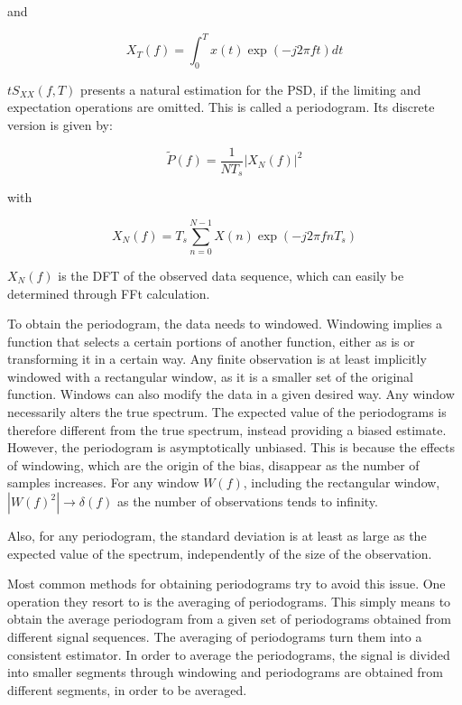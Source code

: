 \begin{refsection}
\noindent and 

\begin{equation}
	X_T(f) = \int_0^T x(t) \exp(-j 2 \pi f t) dt
\end{equation}

$t{S}_{XX}(f,T)$ presents a natural estimation for the PSD, if the limiting and
expectation operations are omitted. This is called a periodogram. Its discrete
version is given by:

\begin{equation}
	\tilde{P}\left(f\right)  = \frac{1}{NT_s}{|X_N{\left(f\right)}|}^2
\end{equation}

\noindent with

\begin{equation}
	X_N\left(f\right) = T_s \sum_{n=0}^{N-1} X(n)
	\exp\left(-j2\pi f n T_s \right)
\end{equation}

$X_N(f)$ is the DFT of the observed data sequence, which can easily be
determined through FFt calculation.

To obtain the periodogram, the data needs to windowed. Windowing implies a
function that selects a certain portions of another function, either as is or
transforming it in a certain way.
Any finite observation is at least implicitly windowed with a
rectangular window, as it is a smaller set of the original function. Windows can
also modify the data in a given desired way. Any window necessarily alters the
true spectrum. The expected value of the periodograms is therefore different from the
true spectrum, instead providing a biased estimate. However, the periodogram is
asymptotically unbiased. This is because the effects of windowing, which are the
origin of the bias, disappear as the number of samples increases. For any window
$W(f)$, including the rectangular window, $|W(f)^2| \to
\delta(f)$ as the number of observations tends to infinity.

Also, for any periodogram, the standard deviation is at least as large as the
expected value of the spectrum, independently of the size of the observation.

Most common methods for obtaining periodograms try to avoid this issue.
One operation they resort to is the averaging of periodograms. This simply means
to obtain the average periodogram from a given set of periodograms obtained from
different signal sequences. The averaging of periodograms turn them into a
consistent estimator. In order to average the periodograms, the signal is
divided into smaller segments through windowing and periodograms are obtained
from different segments, in order to be averaged.


\end{refsection}
